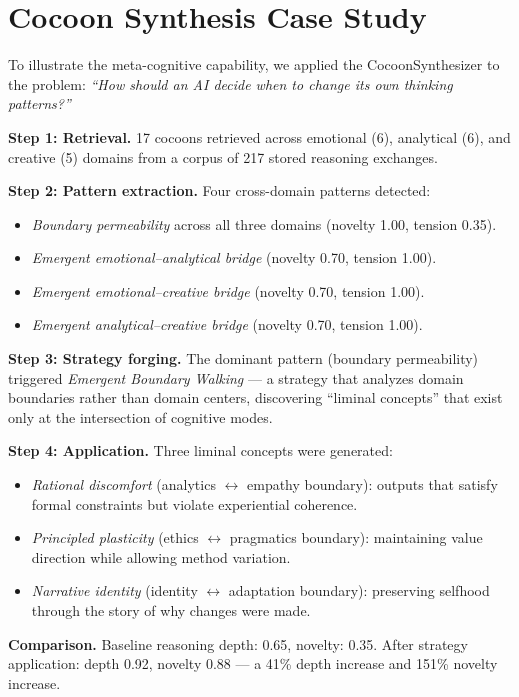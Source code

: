 \documentclass[11pt,a4paper]{article}
\begin{document}
\section{Cocoon Synthesis Case Study}
\label{sec:casestudy}

To illustrate the meta-cognitive capability, we applied the CocoonSynthesizer to the problem: \emph{``How should an AI decide when to change its own thinking patterns?''}

\textbf{Step 1: Retrieval.} 17 cocoons retrieved across emotional (6), analytical (6), and creative (5) domains from a corpus of 217 stored reasoning exchanges.

\textbf{Step 2: Pattern extraction.} Four cross-domain patterns detected:
\begin{itemize}[nosep]
  \item \emph{Boundary permeability} across all three domains (novelty 1.00, tension 0.35).
  \item \emph{Emergent emotional--analytical bridge} (novelty 0.70, tension 1.00).
  \item \emph{Emergent emotional--creative bridge} (novelty 0.70, tension 1.00).
  \item \emph{Emergent analytical--creative bridge} (novelty 0.70, tension 1.00).
\end{itemize}

\textbf{Step 3: Strategy forging.} The dominant pattern (boundary permeability) triggered \emph{Emergent Boundary Walking} --- a strategy that analyzes domain boundaries rather than domain centers, discovering ``liminal concepts'' that exist only at the intersection of cognitive modes.

\textbf{Step 4: Application.} Three liminal concepts were generated:
\begin{itemize}[nosep]
  \item \emph{Rational discomfort} (analytics $\leftrightarrow$ empathy boundary): outputs that satisfy formal constraints but violate experiential coherence.
  \item \emph{Principled plasticity} (ethics $\leftrightarrow$ pragmatics boundary): maintaining value direction while allowing method variation.
  \item \emph{Narrative identity} (identity $\leftrightarrow$ adaptation boundary): preserving selfhood through the story of why changes were made.
\end{itemize}

\textbf{Comparison.} Baseline reasoning depth: 0.65, novelty: 0.35. After strategy application: depth 0.92, novelty 0.88 --- a 41\% depth increase and 151\% novelty increase.
\end{document}
